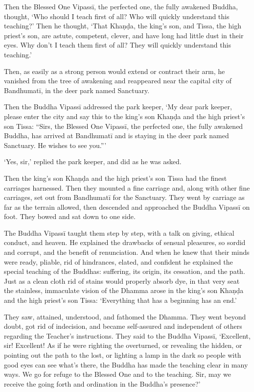 \documentclass[12pt,openany]{book}%
\begin{document}
Then the Blessed One \textsanskrit{Vipassī}, the perfected one, the fully awakened Buddha, thought, ‘Who should I teach first of all? Who will quickly understand this teaching?’ Then he thought, ‘That \textsanskrit{Khaṇḍa}, the king’s son, and Tissa, the high priest’s son, are astute, competent, clever, and have long had little dust in their eyes. Why don’t I teach them first of all? They will quickly understand this teaching.’ 

Then, as easily as a strong person would extend or contract their arm, he vanished from the tree of awakening and reappeared near the capital city of \textsanskrit{Bandhumatī}, in the deer park named Sanctuary. 

Then the Buddha \textsanskrit{Vipassī} addressed the park keeper, ‘My dear park keeper, please enter the city and say this to the king’s son \textsanskrit{Khaṇḍa} and the high priest’s son Tissa: “Sirs, the Blessed One \textsanskrit{Vipassī}, the perfected one, the fully awakened Buddha, has arrived at \textsanskrit{Bandhumatī} and is staying in the deer park named Sanctuary. He wishes to see you.”’ 

‘Yes, sir,’ replied the park keeper, and did as he was asked. 

Then the king’s son \textsanskrit{Khaṇḍa} and the high priest’s son Tissa had the finest carriages harnessed. Then they mounted a fine carriage and, along with other fine carriages, set out from \textsanskrit{Bandhumatī} for the Sanctuary. They went by carriage as far as the terrain allowed, then descended and approached the Buddha \textsanskrit{Vipassī} on foot. They bowed and sat down to one side. 

The Buddha \textsanskrit{Vipassī} taught them step by step, with a talk on giving, ethical conduct, and heaven. He explained the drawbacks of sensual pleasures, so sordid and corrupt, and the benefit of renunciation. And when he knew that their minds were ready, pliable, rid of hindrances, elated, and confident he explained the special teaching of the Buddhas: suffering, its origin, its cessation, and the path. Just as a clean cloth rid of stains would properly absorb dye, in that very seat the stainless, immaculate vision of the Dhamma arose in the king’s son \textsanskrit{Khaṇḍa} and the high priest’s son Tissa: ‘Everything that has a beginning has an end.’ 

They saw, attained, understood, and fathomed the Dhamma. They went beyond doubt, got rid of indecision, and became self-assured and independent of others regarding the Teacher’s instructions. They said to the Buddha \textsanskrit{Vipassī}, ‘Excellent, sir! Excellent! As if he were righting the overturned, or revealing the hidden, or pointing out the path to the lost, or lighting a lamp in the dark so people with good eyes can see what’s there, the Buddha has made the teaching clear in many ways. We go for refuge to the Blessed One and to the teaching. Sir, may we receive the going forth and ordination in the Buddha’s presence?’ 
\end{document}
